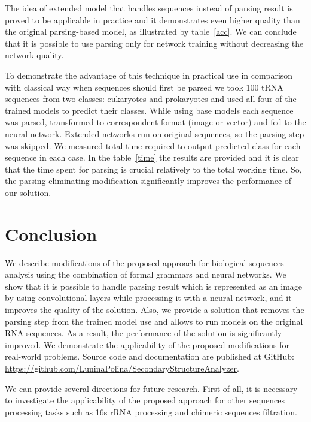 \documentclass[runningheads]{llncs}
\begin{document}
The idea of extended model that handles sequences instead of parsing result is proved to be applicable in practice and it demonstrates even higher quality than the original parsing-based model, as illustrated by table~\ref{acc}.
We can conclude that it is possible to use parsing only for network training without decreasing the network quality.

To demonstrate the advantage of this technique in practical use 
in comparison with classical way when sequences should first be parsed we took 100 tRNA sequences from two classes: eukaryotes and prokaryotes and used all four of the trained models to predict their classes. While using base models each sequence was parsed, transformed to correspondent format (image or vector) and fed to the neural network. Extended networks run on original sequences, so the parsing step was skipped. We measured total time required to output predicted class for each sequence in each case. In the table~\ref{time} the results are provided and it is clear that the time spent for parsing is crucial relatively to the total working time. So, the parsing eliminating modification significantly improves the performance of our solution.




\section{Conclusion}
We describe modifications of the proposed approach for biological sequences analysis using the combination of formal grammars and neural networks.
We show that it is possible to handle parsing result which is represented as an image by using convolutional layers while processing it with a neural network, and it improves the quality of the solution.
Also, we provide a solution that removes the parsing step from the trained model use and allows to run models on the original RNA sequences.
As a result, the performance of the solution is significantly improved.
We demonstrate the applicability of the proposed modifications for real-world problems.
Source code and documentation are published at GitHub: \url{https://github.com/LuninaPolina/SecondaryStructureAnalyzer}.

We can provide several directions for future research.
First of all, it is necessary to investigate the applicability of the proposed approach for other sequences processing tasks such as 16s rRNA processing and chimeric sequences filtration.
\end{document}
